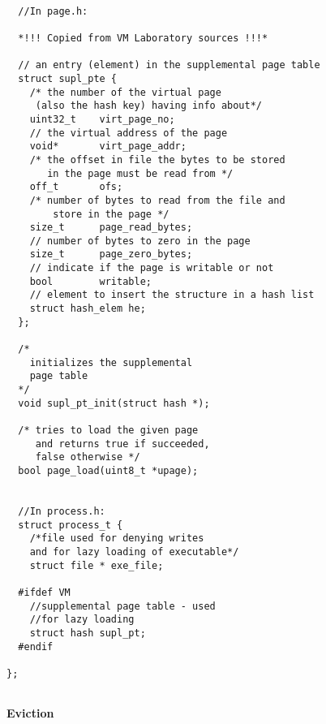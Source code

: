 \begin{lstlisting}
 
  //In page.h:
  
  *!!! Copied from VM Laboratory sources !!!*

  // an entry (element) in the supplemental page table
  struct supl_pte {					
	/* the number of the virtual page 
	 (also the hash key) having info about*/
	uint32_t	virt_page_no; 			
	// the virtual address of the page
	void*		virt_page_addr;			
	/* the offset in file the bytes to be stored 
	   in the page must be read from */
	off_t 		ofs;				
	/* number of bytes to read from the file and
	    store in the page */
	size_t 		page_read_bytes;		
	// number of bytes to zero in the page
	size_t 		page_zero_bytes; 		
	// indicate if the page is writable or not
	bool		writable;		
	// element to insert the structure in a hash list
	struct hash_elem he;				
  };

  /*
    initializes the supplemental
    page table
  */
  void supl_pt_init(struct hash *);
  
  /* tries to load the given page
     and returns true if succeeded,
     false otherwise */
  bool page_load(uint8_t *upage);


  //In process.h:
  struct process_t {
    /*file used for denying writes 
    and for lazy loading of executable*/
    struct file * exe_file;

  #ifdef VM
    //supplemental page table - used
    //for lazy loading
    struct hash supl_pt;				
  #endif

};
  
\end{lstlisting}

\textbf{Eviction}

